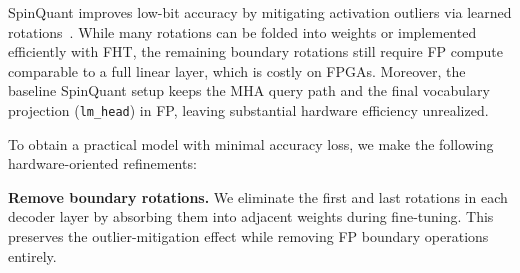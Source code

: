 \documentclass[conference]{IEEEtran}
\begin{document}





SpinQuant improves low-bit accuracy by mitigating activation outliers via learned rotations~\cite{liu2024spinquant}. While many rotations can be folded into weights or implemented efficiently with FHT, the remaining boundary rotations still require FP compute comparable to a full linear layer, which is costly on FPGAs. Moreover, the baseline SpinQuant setup keeps the MHA query path and the final vocabulary projection (\texttt{lm\_head}) in FP, leaving substantial hardware efficiency unrealized.

To obtain a practical model with minimal accuracy loss, we make the following hardware-oriented refinements:

\textbf{Remove boundary rotations.}  
We eliminate the first and last rotations in each decoder layer by absorbing them into adjacent weights during fine-tuning. This preserves the outlier-mitigation effect while removing FP boundary operations entirely.
\end{document}
